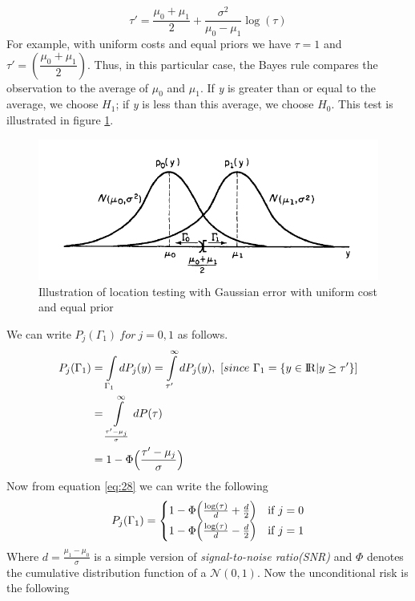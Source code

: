 \documentclass[a4paper,english,12pt]{article}
\begin{document}
\begin{exmp}
\begin{equation}
\tau'=\frac{\mu_{0}+\mu_{1}}{2}+\frac{\sigma^{2}}{\mu_{0}-\mu_{1}}\log(\tau)\label{eq:28}
\end{equation}
For example, with uniform costs and equal priors we have $\tau=1$ and $\tau'=(\dfrac{\mu_{0} + \mu_{1}}{2})$. Thus, in this particular case, the Bayes rule compares the observation to the average of $\mu_{0}$ and $\mu_{1}$. If \textit{y} is greater than or equal to the average, we choose $H_{1}$; if \textit{y} is less than this average, we choose $H_{0}$. This test is illustrated in figure \ref{fig:locationtesting}.
\begin{figure}[h]
\centering
\includegraphics[width=0.75\linewidth]{Figures/Location_Gaussian}
\caption{Illustration of location testing with Gaussian error with uniform cost and equal prior}
\label{fig:locationtesting}
\end{figure}
We can write $P_j(\Gamma_1)~ for~j=0,1$ as follows.
\begin{align}
P_{j}(\Gamma_{1})&=\int\limits_{{\Gamma_1}}  {d{P_j}(y)}
				=\int\limits_{{\tau'}}^\infty  {d{P_j}(y)},~[since~ \Gamma_1=\{y\in{\rm I\!R}|y\geq\tau'\}]\nonumber\\
				&=\int\limits_{{\frac{\tau'-\mu_j}{\sigma}}}^\infty  {d{P}(\tau)}\nonumber\\
				&=1-\Phi\Bigl(\frac{\tau'-\mu_j}{\sigma}\Bigr)
				\end{align}
Now from equation \ref{eq:28} we can write the following
\begin{equation}
P_{j}(\Gamma_{1})= 
				  \begin{cases} 
				   1-\Phi\Bigl(\frac{\log(\tau)}{d}+\frac{d}{2}\Bigr) & \text{if }  j= 0 \\
				   1-\Phi\Bigl(\frac{\log(\tau)}{d}-\frac{d}{2}\Bigr) & \text{if }  j= 1
				  \end{cases}
\end{equation}
Where $d=\frac{\mu_{1}-\mu_{0}}{\sigma}$ is a simple version of \textit{signal-to-noise ratio(SNR)} and $\Phi$ denotes the cumulative distribution function of a $\mathcal{N}( 0, 1)$. Now the unconditional risk is the following
\begin{equation}

\end{equation}
\end{exmp}
\end{document}
